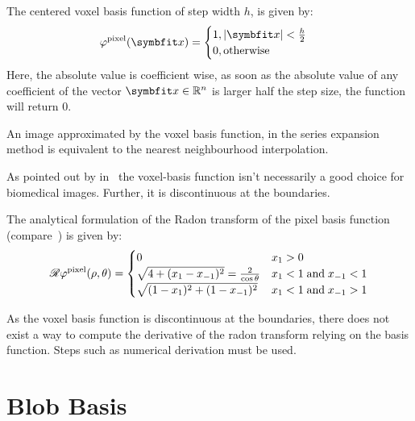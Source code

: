 The centered voxel basis function of step width \(h\), is given by:
\begin{equation}\label{eq:voxel_basis_fn}
	\varphi^{\text{pixel}}(\mvec{x}) =
	\begin{cases}
		1, \abs{\mvec{x}} < \frac{h}{2} \\
		0, \text{otherwise}
	\end{cases}
\end{equation}
Here, the absolute value is coefficient wise, as soon as the absolute value of any coefficient of
the vector \(\mvec{x} \in \mathbb{R}^n\) is larger half the step size, the function will return
\(0\).


An image approximated by the voxel basis function, in the series expansion method is equivalent to
the nearest neighbourhood interpolation.

As pointed out by \citeauthor*{lewitt_multidimensional_1990}
in~\cite{lewitt_multidimensional_1990,lewitt_alternatives_1992} the voxel-basis function isn't
necessarily a good choice for biomedical images. Further, it is discontinuous at the boundaries.

The analytical formulation of the Radon transform of the pixel basis function
(compare~\cite{toft_radon_1996}) is given by:
\begin{equation}\label{eq:radon_voxel_basis}
	\mathscr{R}\varphi^{\text{pixel}}(\rho, \theta) =
	\begin{cases}
		0                                                  & x_1 > 0                         \\
		\sqrt{4 + (x_1 - x_{-1})^2} = \frac{2}{\cos\theta} & x_1 < 1\;\text{and}\;x_{-1} < 1 \\
		\sqrt{(1 - x_1)^2 + (1 - x_{-1})^2}                & x_1 < 1\;\text{and}\;x_{-1} > 1
	\end{cases}
\end{equation}

As the voxel basis function is discontinuous at the boundaries, there does not exist a way to
compute the derivative of the radon transform relying on the basis function. Steps such as numerical
derivation must be used.


\section{Blob Basis}\label{sec:blob_basis}

